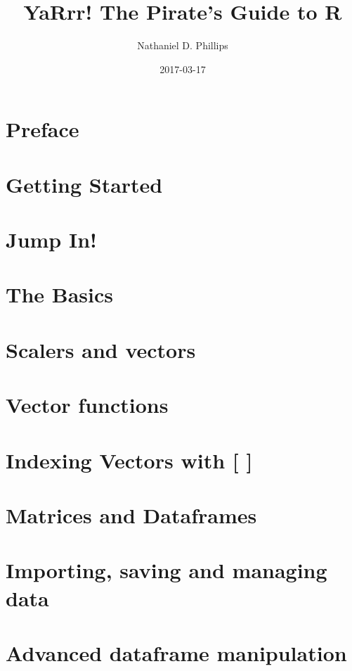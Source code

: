\documentclass[]{book}
\title{YaRrr! The Pirate's Guide to R}
\author{Nathaniel D. Phillips}
\date{2017-03-17}
\theoremstyle{definition}
\theoremstyle{definition}
\theoremstyle{remark}
\begin{document}
\maketitle

{
\setcounter{tocdepth}{1}
\tableofcontents
}
\chapter{Preface}\label{intro}

\chapter{Getting Started}\label{started}

\chapter{Jump In!}\label{jumpin}

\chapter{The Basics}\label{basics}

\chapter{Scalers and vectors}\label{scalersvectors}

\chapter{Vector functions}\label{vectorfunctions}

\chapter{Indexing Vectors with {[} {]}}\label{vectorindexing}

\chapter{Matrices and Dataframes}\label{matricesdataframes}

\chapter{Importing, saving and managing data}\label{importingdata}

\chapter{Advanced dataframe manipulation}\label{advanceddataframe}
\end{document}
